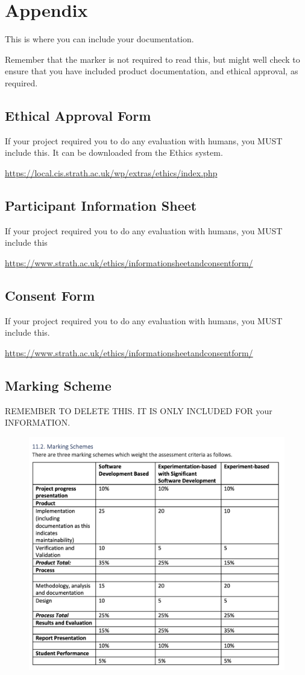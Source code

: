 \section{Appendix}

This is where you can include your documentation.

Remember that the marker is not required to read this, but might well check to ensure that you have included product documentation, and ethical approval, as required.

\subsection{Ethical Approval Form}
If your project required you to do any evaluation with humans, you MUST include this. It can be downloaded from the Ethics system.

\url{https://local.cis.strath.ac.uk/wp/extras/ethics/index.php}

\subsection{Participant Information Sheet }
If your project required you to do any evaluation with humans, you MUST include this

\url{https://www.strath.ac.uk/ethics/informationsheetandconsentform/}

\subsection{Consent Form }
If your project required you to do any evaluation with humans, you MUST include this.

\url{https://www.strath.ac.uk/ethics/informationsheetandconsentform/}

\clearpage
\subsection{Marking Scheme}
REMEMBER TO DELETE THIS. IT IS ONLY INCLUDED FOR your INFORMATION.

\begin{figure}[h]
    \centering
    \includegraphics[width=\textwidth]{figs/marking.png}

\end{figure}